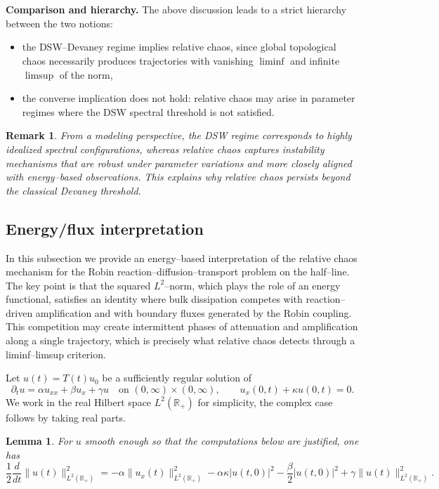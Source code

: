 \documentclass[12pt]{article}
\newtheorem{lemma}[theorem]{Lemma}
\newtheorem{remark}[theorem]{Remark}
\begin{document}
\\
\\
\textbf{Comparison and hierarchy.}
The above discussion leads to a strict hierarchy between the two notions:
\begin{itemize}
\item the DSW--Devaney regime implies relative chaos, since global topological chaos necessarily produces trajectories with vanishing $\liminf$ and infinite $\limsup$ of the norm,
\item the converse implication does not hold: relative chaos may arise in parameter regimes where the DSW spectral threshold is not satisfied.
\end{itemize}

\begin{remark}
From a modeling perspective, the DSW regime corresponds to highly idealized spectral configurations, whereas relative chaos captures instability mechanisms that are robust under parameter variations and more closely aligned with energy--based observations. This explains why relative chaos persists beyond the classical Devaney threshold.
\end{remark}

\subsection{Energy/flux interpretation}

In this subsection we provide an energy--based interpretation of the relative chaos mechanism for the Robin reaction--diffusion--transport problem on the half--line. The key point is that the squared $L^2$--norm, which plays the role of an energy functional, satisfies an identity where bulk dissipation competes with reaction--driven amplification and with boundary fluxes generated by the Robin coupling. This competition may create intermittent phases of attenuation and amplification along a single trajectory, which is precisely what relative chaos detects through a liminf--limsup criterion.


Let $u(t)=T(t)u_0$ be a sufficiently regular solution of
\[
\partial_t u=\alpha u_{xx}+\beta u_x+\gamma u
\quad\text{on }(0,\infty)\times(0,\infty),
\qquad
u_x(0,t)+\kappa u(0,t)=0.
\]
We work in the real Hilbert space $L^2(\mathbb{R}_+)$ for simplicity, the complex case follows by taking real parts.

\begin{lemma}\label{lem:energy_identity_flux}
For $u$ smooth enough so that the computations below are justified, one has 
\begin{equation}\label{eq:energy_identity_flux}
\frac{1}{2}\frac{d}{dt}\|u(t)\|_{L^2(\mathbb{R}_+)}^2
=
-\alpha\|u_x(t)\|_{L^2(\mathbb{R}_+)}^2
-\alpha\kappa |u(t,0)|^2
-\frac{\beta}{2}|u(t,0)|^2
+\gamma\|u(t)\|_{L^2(\mathbb{R}_+)}^2 .
\end{equation}
\end{lemma}
\end{document}
